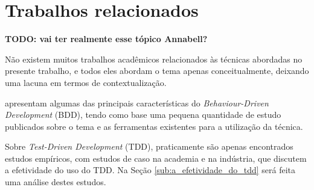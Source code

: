 \section{Trabalhos relacionados} %
\label{sec:trabalhos_relacionados}

\textbf{TODO: vai ter realmente esse tópico Annabell?}

Não existem muitos trabalhos acadêmicos relacionados às técnicas abordadas no presente trabalho, e todos eles abordam o tema apenas conceitualmente, deixando uma lacuna em termos de contextualização.

 apresentam algumas das principais características do \textit{Behaviour-Driven Development} (BDD), tendo como base uma pequena quantidade de estudo publicados sobre o tema e as ferramentas existentes para a utilização da técnica.

Sobre \textit{Test-Driven Development} (TDD), praticamente são apenas encontrados estudos empíricos, com estudos de caso na academia e na indústria, que discutem a efetividade do uso do TDD. Na Seção \ref{sub:a_efetividade_do_tdd} será feita uma análise destes estudos.

